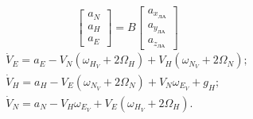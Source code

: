 \begin{equation} 
\label{eq:maccel} 
\left[\begin{array}{c} 
{a_{N}} \\ 
{a_{H}} \\ 
{a_{E}} \end{array}\right]=
B\left[\begin{array}{c} 
{a_{x_{\text{ЛА}}}} \\ 
{a_{y_{\text{ЛА}}}} \\ 
{a_{z_{\text{ЛА}}}} 
\end{array}\right]                                                    
\end{equation} 
\begin{equation} 
\label{eq:mdv} 
\begin{array}{l} 
{\dot{V}_{E} =a_{E} -V_{N}(\omega_{H_{V}} +2\Omega_{H} )+V_{H} (\omega_{N_{V}} +2\Omega_{N} );} \\ 
{\dot{V}_{H} =a_{H} -V_{E}(\omega_{N_{V}} +2\Omega_{N} )+V_{N} \omega_{E_{V}} +g_{H} ;} \\ 
{\dot{V}_{N} =a_{N} -V_{H} \omega_{E_{V}} +V_{E} (\omega_{H_{V}} +2\Omega_{H} ).} 
\end{array} 
\end{equation} 

